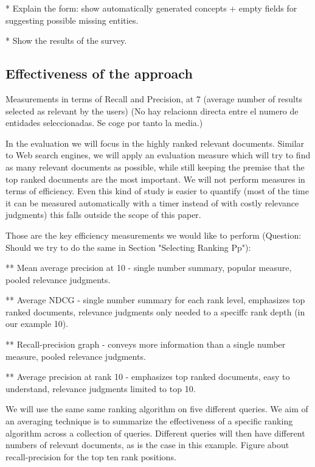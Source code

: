 \documentclass{llncs}
\begin{document}
* Explain the form: show automatically generated concepts + empty fields for suggesting possible missing entities.

* Show the results of the survey.

\subsection{Effectiveness of the approach}
 
Measurements in terms of Recall and Precision, at 7 (average number of results selected as relevant by the users)
 (No hay relacionn directa entre el numero de entidades seleccionadas. Se coge por tanto la media.)
 
In the evaluation we will focus in the highly ranked relevant documents. Similar to Web search engines, we will apply an evaluation measure which will try to find as many relevant documents as possible, while still keeping the  premise that the top ranked documents are the most important. We will not perform measures in terms of efficiency. Even this kind of study is easier to quantify (most of the time it can be measured automatically with a timer instead of with costly relevance judgments) this falls outside the scope of this paper. 

Those are the key efficiency measurements we would like to perform (Question: Should we try to do the same in Section "Selecting Ranking Pp"):

** Mean average precision at 10  - single number summary, popular measure, pooled
relevance judgments.

** Average NDCG - single number summary for each rank level, emphasizes top ranked documents, relevance judgments only needed to a speciffc rank depth
(in our example 10).

** Recall-precision graph - conveys more information than a single number measure, pooled relevance judgments.

** Average precision at rank 10 - emphasizes top ranked documents, easy to understand, relevance judgments limited to top 10.

We will use the same same ranking algorithm on five different queries. We aim of an averaging technique is to summarize the effectiveness of a specific ranking algorithm across a collection of queries. Different queries will then have different numbers of relevant documents, as is the case in this example. Figure about recall-precision for the top ten rank positions.

\end{document}
